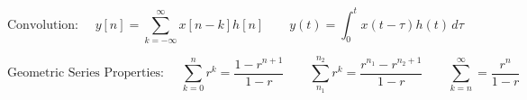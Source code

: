 \vspace{-10pt}

$$\boxed{\text{Convolution: }\quad y[n]=\sum_{k=-\infty}^{\infty}x[n-k]h[n]\quad\quad y(t)=\int_0^t x(t-\tau)h(t)\,d\tau}$$

\vspace{-10pt}

$$\boxed{\text{Geometric Series Properties: }\quad \sum_{k=0}^{n}r^k=\frac{1-r^{n+1}}{1-r}\quad\quad\sum_{n_1}^{n_2}r^k=\frac{r^{n_1}-r^{n_2+1}}{1-r}\quad\quad\sum_{k=n}^{\infty}=\frac{r^{n}}{1-r}}$$



